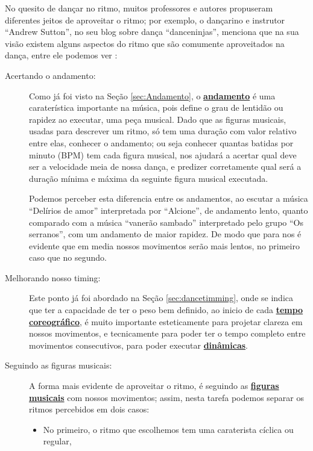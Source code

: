 No quesito de dançar no ritmo, muitos professores e autores propuseram diferentes jeitos de aproveitar o ritmo; 
por exemplo, o dançarino e instrutor ``Andrew Sutton'', 
no seu blog sobre dança ``danceninjas'',
menciona que na sua visão existem alguns aspectos do ritmo que são comumente aproveitados na dança,
entre ele podemos ver \cite{AndrewSuttonRitmo1}:  
\begin{description}
\item [Acertando o andamento:]%
Como já foi visto na Seção \ref{sec:Andamento},
o \hyperref[sec:Andamento]{\textbf{andamento}} é uma caraterística importante na música,
pois define o grau de lentidão ou rapidez ao executar,
uma peça musical. 
Dado que as figuras musicais, usadas para descrever um ritmo, 
só tem uma duração com valor relativo entre elas,
conhecer o andamento; ou seja conhecer quantas batidas por minuto (BPM) tem cada figura musical,
nos ajudará a acertar qual deve ser a velocidade meia de nossa dança,
e predizer corretamente qual será a duração mínima e máxima da seguinte figura musical executada.
\begin{example}
Podemos perceber esta diferencia entre os andamentos, 
ao escutar a música ``Delírios de amor'' interpretada por ``Alcione'', 
de andamento lento, 
quanto comparado com a música ``vanerão sambado'' interpretado pelo grupo ``Os serranos'', 
com um andamento de maior rapidez.
De modo que para nos é evidente que em media nossos movimentos serão mais lentos,
no primeiro caso que no segundo.
\end{example}
\item [Melhorando nosso timing:]
Este ponto já foi abordado na Seção \ref{sec:dancetimming},
onde se indica que ter a capacidade de ter o peso bem definido,
ao inicio de cada \hyperref[sec:TemposCoreograficos]{\textbf{tempo coreográfico}}, 
é muito importante esteticamente para projetar clareza em nossos movimentos,
e tecnicamente para poder ter o tempo completo entre movimentos consecutivos,
para poder executar \hyperref[sec:musicalidade:dinamicas]{\textbf{dinâmicas}}.
\item [Seguindo as figuras musicais:]
A forma mais evidente de aproveitar o ritmo, 
é seguindo as \hyperref[sec:figurasmusicais]{\textbf{figuras musicais}} com nossos movimentos;
assim, nesta tarefa podemos separar os ritmos percebidos em dois casos:
\begin{itemize} 
\item No primeiro, o ritmo que escolhemos tem uma caraterista cíclica ou regular,

\end{itemize}
\end{description}
